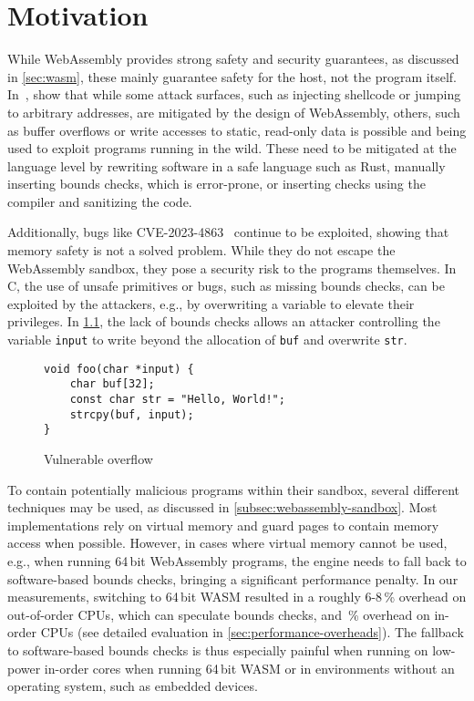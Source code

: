 \chapter{Motivation}
\label{ch:motivation}

While WebAssembly provides strong safety and security guarantees, as discussed in \cref{sec:wasm}, these mainly guarantee safety for the host, not the program itself.
In~\cite{lehmann2020everything}, \citeauthor*{lehmann2020everything} show that while some attack surfaces, such as injecting shellcode or jumping to arbitrary addresses, are mitigated by the design of WebAssembly, others, such as buffer overflows or write accesses to static, read-only data is possible and being used to exploit programs running in the wild.
These need to be mitigated at the language level by rewriting software in a safe language such as Rust, manually inserting bounds checks, which is error-prone, or inserting checks using the compiler and sanitizing the code.

Additionally, bugs like {CVE-2023-4863}~\cite{CVE-2023-4863} continue to be exploited, showing that memory safety is not a solved problem.
While they do not escape the WebAssembly sandbox, they pose a security risk to the programs themselves.
In C, the use of unsafe primitives or bugs, such as missing bounds checks, can be exploited by the attackers, e.g., by overwriting a variable to elevate their privileges.
In \cref{fig:vulnerable-overflow}, the lack of bounds checks allows an attacker controlling the variable \texttt{input} to write beyond the allocation of \texttt{buf} and overwrite \texttt{str}.

\begin{figure}[h]
    \centering
    \begin{lstlisting}[frame=h,style=customc,label={lst:vulnerable-overflow}]
void foo(char *input) {
    char buf[32];
    const char str = "Hello, World!";
    strcpy(buf, input);
}
    \end{lstlisting}
    \caption{Vulnerable overflow}
    \label{fig:vulnerable-overflow}
\end{figure}

To contain potentially malicious programs within their sandbox, several different techniques may be used, as discussed in \cref{subsec:webassembly-sandbox}.
Most implementations rely on virtual memory and guard pages to contain memory access when possible.
However, in cases where virtual memory cannot be used, e.g., when running 64\,bit WebAssembly programs, the engine needs to fall back to software-based bounds checks, bringing a significant performance penalty.
In our measurements, switching to 64\,bit \ac{WASM} resulted in a roughly 6-8\,\% overhead on out-of-order CPUs, which can speculate bounds checks, and \,\% overhead on in-order CPUs (see detailed evaluation in \cref{sec:performance-overheads}).
The fallback to software-based bounds checks is thus especially painful when running on low-power in-order cores when running 64\,bit \ac{WASM} or in environments without an operating system, such as embedded devices.

